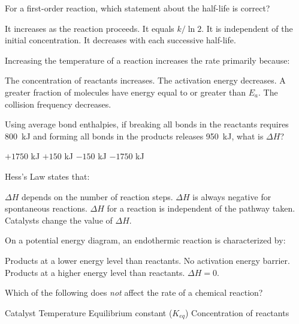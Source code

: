 \documentclass[addpoints]{exam}
\begin{document}
\begin{questions}
\question[1] For a first-order reaction, which statement about the half-life is correct?
\begin{choices}
    \choice It increases as the reaction proceeds.
    \choice It equals $k/\ln 2$.
    \correctchoice It is independent of the initial concentration.
    \choice It decreases with each successive half-life.
\end{choices}

\question[1] Increasing the temperature of a reaction increases the rate primarily because:
\begin{choices}
    \choice The concentration of reactants increases.
    \choice The activation energy decreases.
    \correctchoice A greater fraction of molecules have energy equal to or greater than $E_a$.
    \choice The collision frequency decreases.
\end{choices}

\question[1] Using average bond enthalpies, if breaking all bonds in the reactants requires
\SI{800}{kJ} and forming all bonds in the products releases \SI{950}{kJ}, what is $\Delta H$?
\begin{choices}
    \choice $+1750$ kJ
    \choice $+150$ kJ
    \correctchoice $-150$ kJ
    \choice $-1750$ kJ
\end{choices}

\question[1] Hess's Law states that:
\begin{choices}
    \choice $\Delta H$ depends on the number of reaction steps.
    \choice $\Delta H$ is always negative for spontaneous reactions.
    \correctchoice $\Delta H$ for a reaction is independent of the pathway taken.
    \choice Catalysts change the value of $\Delta H$.
\end{choices}

\question[1] On a potential energy diagram, an endothermic reaction is characterized by:
\begin{choices}
    \choice Products at a lower energy level than reactants.
    \choice No activation energy barrier.
    \correctchoice Products at a higher energy level than reactants.
    \choice $\Delta H = 0$.
\end{choices}

\question[1] Which of the following does \textit{not} affect the rate of a chemical reaction?
\begin{choices}
    \choice Catalyst
    \choice Temperature
    \correctchoice Equilibrium constant ($K_{eq}$)
    \choice Concentration of reactants
\end{choices}


\end{questions}
\end{document}

